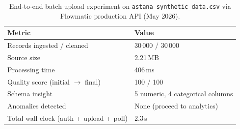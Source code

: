 
\begin{table}[H]
  \centering
  \caption{End-to-end batch upload experiment on \texttt{astana\_synthetic\_data.csv} via Flowmatic production API (May 2026).}
  \label{tab:upload-pipeline-experiment}
  \begin{tabular}{@{}ll@{}}
    \toprule
    \textbf{Metric} & \textbf{Value} \\
    \midrule
    Records ingested / cleaned & 30\,000 / 30\,000 \\
    Source size & 2.21\,MB \\
    Processing time & 406\,ms \\
    Quality score (initial $\rightarrow$ final) & 100 / 100 \\
    Schema insight & 5 numeric, 4 categorical columns \\
    Anomalies detected & None (proceed to analytics) \\
    Total wall-clock (auth + upload + poll) & 2.3\,s \\
    \bottomrule
  \end{tabular}
\end{table}

